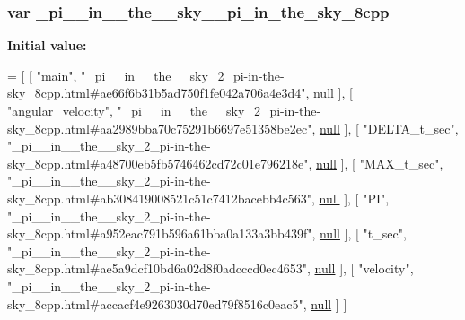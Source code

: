 \subsubsection[{\texorpdfstring{\+\_\+pi\+\_\+\+\_\+in\+\_\+\+\_\+the\+\_\+\+\_\+sky\+\_\+2\+\_\+pi\+\_\+in\+\_\+the\+\_\+sky\+\_\+8cpp}{_pi__in__the__sky_2_pi_in_the_sky_8cpp}}]{\setlength{\rightskip}{0pt plus 5cm}var \+\_\+pi\+\_\+\+\_\+in\+\_\+\+\_\+the\+\_\+\+\_\+sky\+\_\+\_\+pi\+\_\+in\+\_\+the\+\_\+sky\+\_\+8cpp}\hypertarget{__pi____in____the____sky__2__pi-in-the-sky__8cpp_8js_a5be10b6a3da49fbd822befca4be63079}{}\label{__pi____in____the____sky__2__pi-in-the-sky__8cpp_8js_a5be10b6a3da49fbd822befca4be63079}
{\bfseries Initial value\+:}
\begin{DoxyCode}
=
[
    [ \textcolor{stringliteral}{"main"}, \textcolor{stringliteral}{"\_pi\_\_in\_\_the\_\_sky\_2\_pi-in-the-sky\_8cpp.html#ae66f6b31b5ad750f1fe042a706a4e3d4"}, 
      \hyperlink{namespacenlohmann_1_1detail_a1ed8fc6239da25abcaf681d30ace4985a37a6259cc0c1dae299a7866489dff0bd}{null} ],
    [ \textcolor{stringliteral}{"angular\_velocity"}, \textcolor{stringliteral}{"\_pi\_\_in\_\_the\_\_sky\_2\_pi-in-the-sky\_8cpp.html#aa2989bba70c75291b6697e51358be2ec"}, 
      \hyperlink{namespacenlohmann_1_1detail_a1ed8fc6239da25abcaf681d30ace4985a37a6259cc0c1dae299a7866489dff0bd}{null} ],
    [ \textcolor{stringliteral}{"DELTA\_t\_sec"}, \textcolor{stringliteral}{"\_pi\_\_in\_\_the\_\_sky\_2\_pi-in-the-sky\_8cpp.html#a48700eb5fb5746462cd72c01e796218e"}, 
      \hyperlink{namespacenlohmann_1_1detail_a1ed8fc6239da25abcaf681d30ace4985a37a6259cc0c1dae299a7866489dff0bd}{null} ],
    [ \textcolor{stringliteral}{"MAX\_t\_sec"}, \textcolor{stringliteral}{"\_pi\_\_in\_\_the\_\_sky\_2\_pi-in-the-sky\_8cpp.html#ab308419008521c51c7412bacebb4c563"}, 
      \hyperlink{namespacenlohmann_1_1detail_a1ed8fc6239da25abcaf681d30ace4985a37a6259cc0c1dae299a7866489dff0bd}{null} ],
    [ \textcolor{stringliteral}{"PI"}, \textcolor{stringliteral}{"\_pi\_\_in\_\_the\_\_sky\_2\_pi-in-the-sky\_8cpp.html#a952eac791b596a61bba0a133a3bb439f"}, 
      \hyperlink{namespacenlohmann_1_1detail_a1ed8fc6239da25abcaf681d30ace4985a37a6259cc0c1dae299a7866489dff0bd}{null} ],
    [ \textcolor{stringliteral}{"t\_sec"}, \textcolor{stringliteral}{"\_pi\_\_in\_\_the\_\_sky\_2\_pi-in-the-sky\_8cpp.html#ae5a9dcf10bd6a02d8f0adcccd0ec4653"}, 
      \hyperlink{namespacenlohmann_1_1detail_a1ed8fc6239da25abcaf681d30ace4985a37a6259cc0c1dae299a7866489dff0bd}{null} ],
    [ \textcolor{stringliteral}{"velocity"}, \textcolor{stringliteral}{"\_pi\_\_in\_\_the\_\_sky\_2\_pi-in-the-sky\_8cpp.html#accacf4e9263030d70ed79f8516c0eac5"}, 
      \hyperlink{namespacenlohmann_1_1detail_a1ed8fc6239da25abcaf681d30ace4985a37a6259cc0c1dae299a7866489dff0bd}{null} ]
]
\end{DoxyCode}

